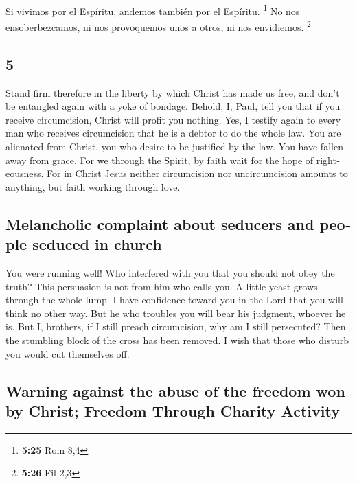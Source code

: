 \begin{paracol}{2}
 Si vivimos por el Espíritu, andemos también por el
Espíritu. \footnote{\textbf{5:25} Rom 8,4}  No nos
ensoberbezcamos, ni nos provoquemos unos a otros, ni nos envidiemos.
\footnote{\textbf{5:26} Fil 2,3}

\switchcolumn
\begin{otherlanguage}{english}

\hypertarget{section-9}{%
\section{5}\label{section-9}}

 Stand firm therefore in the liberty by which Christ has
made us free, and don't be entangled again with a yoke of bondage.
 Behold, I, Paul, tell you that if you receive
circumcision, Christ will profit you nothing.  Yes, I
testify again to every man who receives circumcision that he is a debtor
to do the whole law.  You are alienated from Christ, you
who desire to be justified by the law. You have fallen away from grace.
 For we through the Spirit, by faith wait for the hope of
righteousness.  For in Christ Jesus neither circumcision
nor uncircumcision amounts to anything, but faith working through love.

\hypertarget{melancholic-complaint-about-seducers-and-people-seduced-in-church}{%
\subsection{Melancholic complaint about seducers and people seduced in
church}\label{melancholic-complaint-about-seducers-and-people-seduced-in-church}}

 You were running well! Who interfered with you that you
should not obey the truth?  This persuasion is not from
him who calls you.  A little yeast grows through the whole
lump.  I have confidence toward you in the Lord that you
will think no other way. But he who troubles you will bear his judgment,
whoever he is.  But I, brothers, if I still preach
circumcision, why am I still persecuted? Then the stumbling block of the
cross has been removed.  I wish that those who disturb
you would cut themselves off.

\hypertarget{warning-against-the-abuse-of-the-freedom-won-by-christ-freedom-through-charity-activity}{%
\subsection{Warning against the abuse of the freedom won by Christ;
Freedom Through Charity
Activity}\label{warning-against-the-abuse-of-the-freedom-won-by-christ-freedom-through-charity-activity}}


\end{otherlanguage}
\end{paracol}
